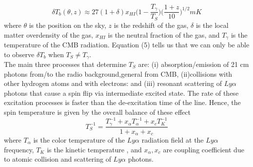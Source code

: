 \begin{equation}
\delta T_b(\theta,z)\approx 27(1+\delta)x_{HI}\Big (1-\frac{T_{\gamma}}{T_S} \Big ) \Big (\frac{1+z}{10} \Big )^{1/2} mK
\end{equation}
where $\theta$ is the position on the sky, $z$ is the redshift of the gas, $\delta$ is the local matter overdensity of the gas, $x_{HI}$ is the neutral fraction of the gas, and $T_\gamma$ is the temperature of the CMB radiation. Equation (5)  tells us that we can only be able to observe $\delta T_b$ when $T_S \neq T_\gamma$. \\
The main three processes that determine $T_S$  are: (i) absorption/emission of 21 cm photons from/to the radio background,general from CMB, (ii)collisions with other hydrogen atoms and with electrons: and (iii) resonant scattering of $Ly\alpha$ photons that cause a spin flip via intermediate excited state\cite{c}. The rate of these excitation processes is faster than the de-excitation time of the line. Hence, the spin temperature is given by the overall balance of these effect\citet{c}
\begin{equation}
T^{-1}_S=\frac{T^{-1}_\gamma+x_{\alpha}T^{-1}_{\alpha}+x_{c}T^{-1}_{K}}{1+x_\alpha+x_c}
\end{equation}
where $T_{\alpha}$ is the color temperature of the $Ly\alpha$ radiation field at the $Ly\alpha$ frequency, $T_K$ is the kinetic temperature , and $x_\alpha, x_c$ are coupling coefficient due to atomic collision and  scattering of $ Ly\alpha$ photons. 

